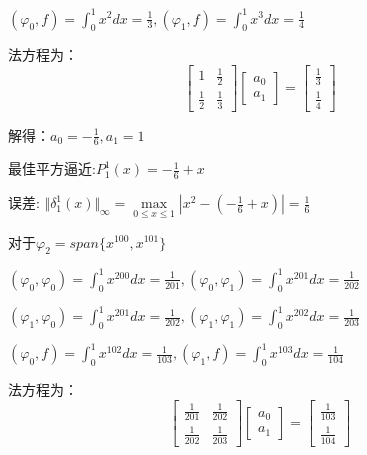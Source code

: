 \documentclass[a4paper]{article}
\begin{document}
$(\varphi_0, f) = \int^{1}_{0}x^2dx = \frac{1}{3}, (\varphi_1, f) = \int^{1}_{0}x^3dx = \frac{1}{4}$

法方程为：
\begin{equation}
    \left[
    \begin{array}{cc}
        1 & \frac{1}{2}  \\
        \frac{1}{2} & \frac{1}{3}
    \end{array}
    \right]
    \left[
    \begin{array}{c}
        a_{0} \\ 
        a_{1} 
    \end{array}
    \right]
    =
    \left[
        \begin{array}{c}
            \frac{1}{3} \\ 
            \frac{1}{4}
        \end{array}
    \right]
    \end{equation}

    解得：$a_0=-\frac{1}{6}, a_1=1$

    最佳平方逼近:$P_1^{1}(x)=-\frac{1}{6}+x$

    误差: $\Vert\delta_1^1(x)\Vert_\infty=\max\limits_{0\leq x\leq 1}|x^2-(-\frac{1}{6}+x)| = \frac{1}{6}$

    对于$\varphi_2=span\{x^{100}, x^{101}\}$

    $(\varphi_0, \varphi_0) = \int^{1}_{0}x^{200}dx = \frac{1}{201},(\varphi_0, \varphi_1) = \int^{1}_{0}x^{201}dx = \frac{1}{202}$
    
    $(\varphi_1, \varphi_0) = \int^{1}_{0}x^{201}dx = \frac{1}{202}, (\varphi_1, \varphi_1) = \int^{1}_{0}x^{202}dx = \frac{1}{203}$
    
    $(\varphi_0, f) = \int^{1}_{0}x^{102}dx = \frac{1}{103}, (\varphi_1, f) = \int^{1}_{0}x^{103}dx = \frac{1}{104}$
    
    法方程为：
    \begin{equation}
        \left[
        \begin{array}{cc}
            \frac{1}{201} & \frac{1}{202}  \\
            \frac{1}{202} & \frac{1}{203}
        \end{array}
        \right]
        \left[
        \begin{array}{c}
            a_{0} \\ 
            a_{1} 
        \end{array}
        \right]
        =
        \left[
            \begin{array}{c}
                \frac{1}{103} \\ 
                \frac{1}{104}
            \end{array}
        \right]
        \end{equation}
    
\end{document}
